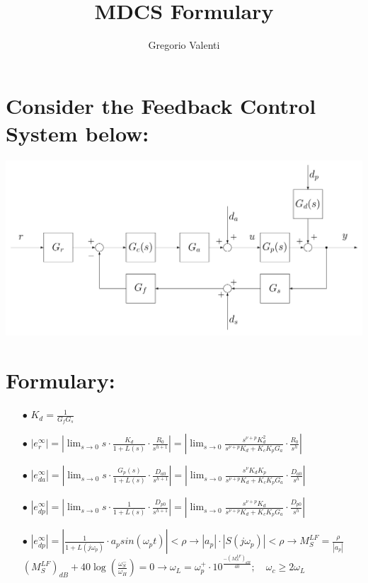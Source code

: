 \documentclass{article}
\title{MDCS Formulary}
\author{Gregorio Valenti}
\date{}
\begin{document}
\section{Consider the Feedback Control System below:}
\hspace{1cm}
\includegraphics[scale=0.5]{feedback_control_system.png}

\section{Formulary:}
\begin{enumerate}
\item[$\bullet$] $K_d = \frac{1}{G_f G_s}$

\item[$\bullet$] $\left| e_r^\infty \right| = \left| \displaystyle\lim_{s\to0} s \cdot \frac{K_d}{1+L(s)} \cdot \frac{R_0}{s^{h+1}} \right| = \left| \displaystyle\lim_{s\to0} \frac{s^{\nu+p}K_d^2}{s^{\nu+p}K_d+K_cK_pG_a}  \cdot \frac{R_0}{s^{h}} \right|$

\item[$\bullet$] $\left| e_{da}^\infty \right| = \left| \displaystyle\lim_{s\to0} s \cdot \frac{G_p(s)}{1+L(s)} \cdot \frac{D_{a0}}{s^{h+1}} \right| = \left| \displaystyle\lim_{s\to0} \frac{s^{\nu}K_dK_p}{s^{\nu+p}K_d+K_cK_pG_a}  \cdot \frac{D_{a0}}{s^{h}} \right|$

\item[$\bullet$] $\left| e_{dp}^\infty \right| = \left| \displaystyle\lim_{s\to0} s \cdot \frac{1}{1+L(s)} \cdot \frac{D_{p0}}{s^{h+1}} \right| = \left| \displaystyle\lim_{s\to0} \frac{s^{\nu+p}K_d}{s^{\nu+p}K_d+K_cK_pG_a}  \cdot \frac{D_{p0}}{s^{h}} \right|$

\item[$\bullet$] $\left| e_{dp}^\infty \right| = \left| 
\frac{1}{1+L(j\omega_p)} \cdot a_p sin\left(\omega_pt\right) \right| < \rho \to \left| a_p \right| \cdot \left| S(j\omega_p) \right| < \rho \to
M_S^{LF} = \frac{\rho}{\left| a_p \right|}$ \\
$(M_S^{LF})_{dB} + 40 \log \left( \frac{\omega_S^-}{\omega_H} \right) = 0
\to \omega_L = \omega_p^+ \cdot 10^{\frac{-(M_S^{LF})_{dB}}{40}}; \quad
\omega_c \geq 2\omega_L$

\end{enumerate}
\end{document}
